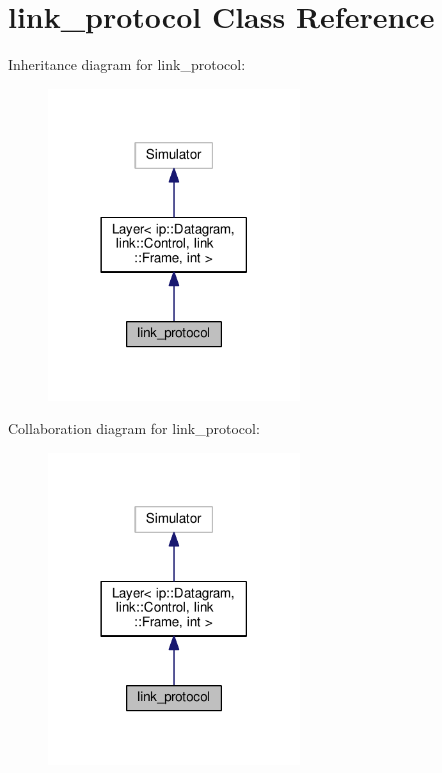 \hypertarget{classlink__protocol}{}\section{link\+\_\+protocol Class Reference}
\label{classlink__protocol}


Inheritance diagram for link\+\_\+protocol\+:
\nopagebreak
\begin{figure}[H]
\begin{center}
\leavevmode
\includegraphics[width=189pt]{classlink__protocol__inherit__graph}
\end{center}
\end{figure}


Collaboration diagram for link\+\_\+protocol\+:
\nopagebreak
\begin{figure}[H]
\begin{center}
\leavevmode
\includegraphics[width=189pt]{classlink__protocol__coll__graph}
\end{center}
\end{figure}
